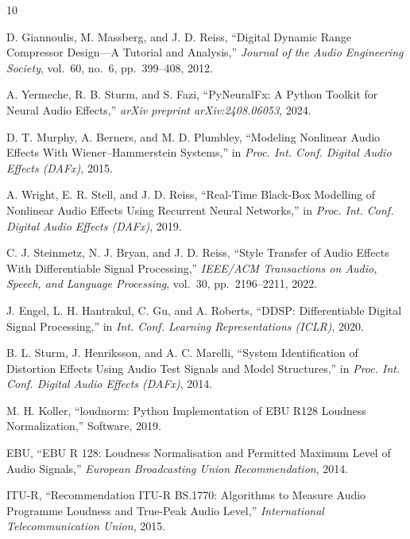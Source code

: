 \documentclass[11pt, letterpaper]{article}
\begin{document}
\begin{thebibliography}{10}

D. Giannoulis, M. Massberg, and J. D. Reiss,
``Digital Dynamic Range Compressor Design---A Tutorial and Analysis,''
\textit{Journal of the Audio Engineering Society}, vol.~60, no.~6, pp.~399--408, 2012.

A. Yermeche, R. B. Sturm, and S. Fazi,
``PyNeuralFx: A Python Toolkit for Neural Audio Effects,''
\textit{arXiv preprint arXiv:2408.06053}, 2024.

D. T. Murphy, A. Berners, and M. D. Plumbley,
``Modeling Nonlinear Audio Effects With Wiener--Hammerstein Systems,''
in \textit{Proc. Int. Conf. Digital Audio Effects (DAFx)}, 2015.

A. Wright, E. R. Stell, and J. D. Reiss,
``Real-Time Black-Box Modelling of Nonlinear Audio Effects Using Recurrent Neural Networks,''
in \textit{Proc. Int. Conf. Digital Audio Effects (DAFx)}, 2019.

C. J. Steinmetz, N. J. Bryan, and J. D. Reiss,
``Style Transfer of Audio Effects With Differentiable Signal Processing,''
\textit{IEEE/ACM Transactions on Audio, Speech, and Language Processing}, vol.~30, pp.~2196--2211, 2022.

J. Engel, L. H. Hantrakul, C. Gu, and A. Roberts,
``DDSP: Differentiable Digital Signal Processing,''
in \textit{Int. Conf. Learning Representations (ICLR)}, 2020.

B. L. Sturm, J. Henriksson, and A. C. Marelli,
``System Identification of Distortion Effects Using Audio Test Signals and Model Structures,''
in \textit{Proc. Int. Conf. Digital Audio Effects (DAFx)}, 2014.

M. H. Koller,
``loudnorm: Python Implementation of EBU R128 Loudness Normalization,''
Software, 2019.

EBU,
``EBU R 128: Loudness Normalisation and Permitted Maximum Level of Audio Signals,''
\textit{European Broadcasting Union Recommendation}, 2014.

ITU-R,
``Recommendation ITU-R BS.1770: Algorithms to Measure Audio Programme Loudness and True-Peak Audio Level,''
\textit{International Telecommunication Union}, 2015.

\end{thebibliography}

\end{document}
